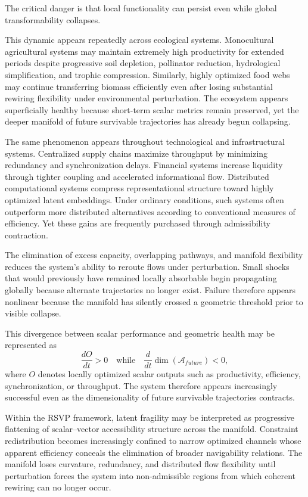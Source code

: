 \documentclass[11pt,a4paper]{article}
\newcommand{\Aspace}{\mathcal{A}}
\begin{document}
The critical danger is that local functionality can persist even while global transformability collapses.

This dynamic appears repeatedly across ecological systems. Monocultural agricultural systems may maintain extremely high productivity for extended periods despite progressive soil depletion, pollinator reduction, hydrological simplification, and trophic compression. Similarly, highly optimized food webs may continue transferring biomass efficiently even after losing substantial rewiring flexibility under environmental perturbation. The ecosystem appears superficially healthy because short-term scalar metrics remain preserved, yet the deeper manifold of future survivable trajectories has already begun collapsing.

The same phenomenon appears throughout technological and infrastructural systems. Centralized supply chains maximize throughput by minimizing redundancy and synchronization delays. Financial systems increase liquidity through tighter coupling and accelerated informational flow. Distributed computational systems compress representational structure toward highly optimized latent embeddings. Under ordinary conditions, such systems often outperform more distributed alternatives according to conventional measures of efficiency. Yet these gains are frequently purchased through admissibility contraction.

The elimination of excess capacity, overlapping pathways, and manifold flexibility reduces the system's ability to reroute flows under perturbation. Small shocks that would previously have remained locally absorbable begin propagating globally because alternate trajectories no longer exist. Failure therefore appears nonlinear because the manifold has silently crossed a geometric threshold prior to visible collapse.

This divergence between scalar performance and geometric health may be represented as
\[
\frac{dO}{dt} > 0
\quad \text{while} \quad
\frac{d}{dt}\dim(\Aspace_{future}) < 0,
\]
where $O$ denotes locally optimized scalar outputs such as productivity, efficiency, synchronization, or throughput. The system therefore appears increasingly successful even as the dimensionality of future survivable trajectories contracts.

Within the RSVP framework, latent fragility may be interpreted as progressive flattening of scalar--vector accessibility structure across the manifold. Constraint redistribution becomes increasingly confined to narrow optimized channels whose apparent efficiency conceals the elimination of broader navigability relations. The manifold loses curvature, redundancy, and distributed flow flexibility until perturbation forces the system into non-admissible regions from which coherent rewiring can no longer occur.
\end{document}

